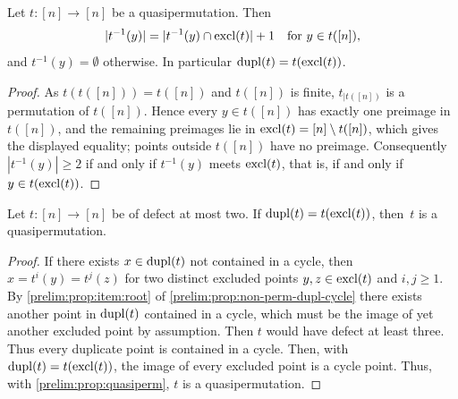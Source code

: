 \begin{lemma} \label{prelim:trans:lem:stable-fibers}
	Let $t \colon [n] \to [n]$ be a quasipermutation. Then
	\[
	|t^{-1}(y)| = |t^{-1}(y) \cap \operatorname{excl}(t)| + 1
	\quad \text{for } y \in t([n]),
	\]
	and $t^{-1}(y) = \emptyset$ otherwise. In particular
	$\operatorname{dupl}(t) = t(\operatorname{excl}(t))$.
\end{lemma}
\begin{proof}
	As $t(t([n])) = t([n])$ and $t([n])$ is finite, $t_{|t([n])}$ is a permutation
	of $t([n])$. Hence every $y \in t([n])$ has exactly one preimage in $t([n])$,
	and the remaining preimages lie in $\operatorname{excl}(t) = [n] \setminus t([n])$, which
	gives the displayed equality; points outside $t([n])$ have no preimage.
	Consequently $|t^{-1}(y)| \ge 2$ if and only if $t^{-1}(y)$ meets $\operatorname{excl}(t)$,
	that is, if and only if $y \in t(\operatorname{excl}(t))$.
\end{proof}

\begin{proposition}
	Let $t \colon [n] \to [n]$ be of defect at most two.
	If $\operatorname{dupl}(t) = t(\operatorname{excl}(t))$, then~$t$ is a quasipermutation. 
\end{proposition}
\begin{proof}
	If there exists $x \in \operatorname{dupl}(t)$
	not contained in a cycle, then $x = t^i(y) = t^j(z)$
	for two distinct excluded points $y, z \in \operatorname{excl}(t)$ and $i,j \ge 1$.
	By \cref{prelim:prop:item:root} of \cref{prelim:prop:non-perm-dupl-cycle} 
	there exists another point in $\operatorname{dupl}(t)$ contained in a cycle,
	which must be the image of yet another excluded point by assumption.
	Then $t$ would have defect at least three.
	Thus every duplicate point is contained in a cycle.
	Then, with $\operatorname{dupl}(t) = t(\operatorname{excl}(t))$,
	the image of every excluded point is a cycle point.
	Thus, with \cref{prelim:prop:quasiperm}, $t$ is a quasipermutation.	
\end{proof}